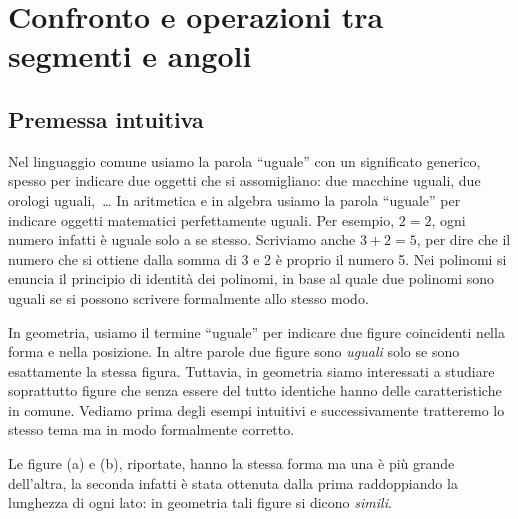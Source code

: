 \vspazio\ovalbox{\risolvii \ref{ese:1.51}, \ref{ese:1.52}, 
\ref{ese:1.53}, \ref{ese:1.54}, \ref{ese:1.55}, \ref{ese:1.56}, 
\ref{ese:1.57}, \ref{ese:1.58}, \ref{ese:1.59}, \ref{ese:1.60}, 
\ref{ese:1.61}, \ref{ese:1.62}, \ref{ese:1.63},
}

\ovalbox{\ref{ese:1.64}, \ref{ese:1.65}}


\section{Confronto e operazioni tra segmenti e 
angoli}\label{sect:operazioni_segmenti_angoli}

\subsection{Premessa intuitiva}

Nel linguaggio comune usiamo la parola ``uguale'' con un significato 
generico, spesso per indicare due oggetti che si assomigliano: due 
macchine uguali, due orologi uguali,~\ldots{} In aritmetica e in 
algebra usiamo la parola ``uguale'' per indicare oggetti matematici 
perfettamente uguali. Per esempio, $2=2$, ogni numero infatti è 
uguale solo a se stesso. Scriviamo anche $3+2=5$, per dire che il 
numero che si ottiene dalla somma di 3 e 2 è proprio il numero 5. Nei 
polinomi si enuncia il principio di identità dei polinomi, in base al 
quale due polinomi sono uguali se si possono scrivere formalmente 
allo stesso modo.

In geometria, usiamo il termine ``uguale'' per indicare due figure 
coincidenti nella forma e nella posizione. In altre parole due figure 
sono \emph{uguali} solo se sono esattamente la stessa figura. 
Tuttavia, in geometria siamo interessati a studiare soprattutto 
figure che senza essere del tutto identiche hanno delle 
caratteristiche in comune. Vediamo prima degli esempi intuitivi e 
successivamente tratteremo lo stesso tema ma in modo formalmente 
corretto.


\begin{inaccessibleblock}
 \begin{figure}[htb]
\centering\qquad\qquad

\end{figure}
\end{inaccessibleblock}

Le figure (a) e (b), riportate, hanno la stessa forma ma una è 
più grande dell'altra, la seconda infatti è stata ottenuta dalla 
prima raddoppiando la lunghezza di ogni lato: in geometria tali 
figure si dicono \emph{simili}.

